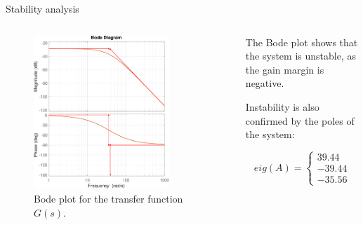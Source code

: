 \begin{frame}{Stability analysis}

    \begin{columns}[c, onlytextwidth]

        \begin{column}{0.60\textwidth}

            \begin{figure}[H]
                \centering
                \includegraphics[width=0.8\textwidth]{./img/MATLAB/analysis/bode_plot_resized.pdf}
                \caption{Bode plot for the transfer function $G(s)$.}
            \end{figure}

        \end{column}

        \begin{column}{0.40\textwidth}

            The Bode plot shows that the system is unstable, as the gain margin is negative.

            \vspace{9pt}

            Instability is also confirmed by the poles of the system:

            \begin{equation}
                eig(A) =
                \begin{cases}
                    39.44  \\
                    -39.44 \\
                    -35.56
                \end{cases}
            \end{equation}

        \end{column}

    \end{columns}

\end{frame}



